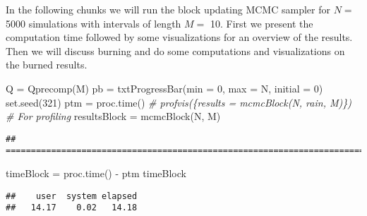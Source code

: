 \documentclass[
]{article}
\newenvironment{Shaded}{\begin{snugshade}}{\end{snugshade}}
\newcommand{\AttributeTok}[1]{\textcolor[rgb]{0.77,0.63,0.00}{#1}}
\newcommand{\CommentTok}[1]{\textcolor[rgb]{0.56,0.35,0.01}{\textit{#1}}}
\newcommand{\DecValTok}[1]{\textcolor[rgb]{0.00,0.00,0.81}{#1}}
\newcommand{\FunctionTok}[1]{\textcolor[rgb]{0.00,0.00,0.00}{#1}}
\newcommand{\NormalTok}[1]{#1}
\newcommand{\OtherTok}[1]{\textcolor[rgb]{0.56,0.35,0.01}{#1}}
\newcommand{\SpecialCharTok}[1]{\textcolor[rgb]{0.00,0.00,0.00}{#1}}
\begin{document}
In the following chunks we will run the block updating MCMC sampler for \(N=\) 5000 simulations with intervals of length \(M=\) 10. First we present the computation time followed by some visualizations for an overview of the results. Then we will discuss burning and do some computations and visualizations on the burned results.

\begin{Shaded}
\begin{Highlighting}[]

\NormalTok{Q }\OtherTok{=} \FunctionTok{Qprecomp}\NormalTok{(M)}
\NormalTok{pb }\OtherTok{=} \FunctionTok{txtProgressBar}\NormalTok{(}\AttributeTok{min =} \DecValTok{0}\NormalTok{, }\AttributeTok{max =}\NormalTok{ N, }\AttributeTok{initial =} \DecValTok{0}\NormalTok{)}
\FunctionTok{set.seed}\NormalTok{(}\DecValTok{321}\NormalTok{)}
\NormalTok{ptm }\OtherTok{=} \FunctionTok{proc.time}\NormalTok{()}
\CommentTok{\# profvis(\{results = mcmcBlock(N, rain, M)\}) \# For profiling}
\NormalTok{resultsBlock }\OtherTok{=} \FunctionTok{mcmcBlock}\NormalTok{(N, M)}
\end{Highlighting}
\end{Shaded}

\begin{verbatim}
## ================================================================================
\end{verbatim}

\begin{Shaded}
\begin{Highlighting}[]
\NormalTok{timeBlock }\OtherTok{=} \FunctionTok{proc.time}\NormalTok{() }\SpecialCharTok{{-}}\NormalTok{ ptm}
\NormalTok{timeBlock}
\end{Highlighting}
\end{Shaded}

\begin{verbatim}
##    user  system elapsed 
##   14.17    0.02   14.18
\end{verbatim}

\begin{Shaded}
\end{Shaded}
\end{document}
